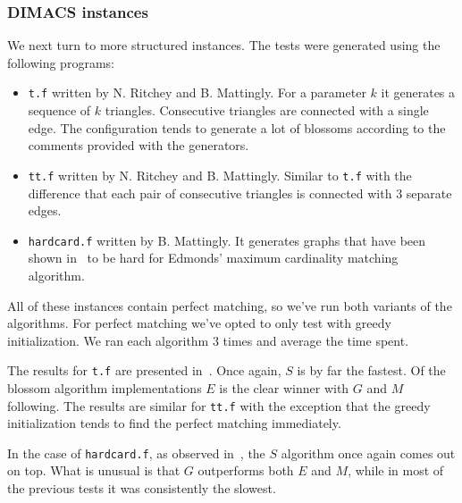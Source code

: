 \subsubsection*{DIMACS instances}

We next turn to more structured instances. The tests were generated using the following programs:

\begin{itemize}
    \item \texttt{t.f} written by N. Ritchey and B. Mattingly. For a parameter $k$ it generates a sequence of $k$ triangles. Consecutive triangles are connected with a single edge. The configuration tends to generate a lot of blossoms according to the comments provided with the generators.
    \item \texttt{tt.f} written by N. Ritchey and B. Mattingly. Similar to \texttt{t.f} with the difference that each pair of consecutive triangles is connected with $3$ separate edges.
    \item \texttt{hardcard.f} written by B. Mattingly. It generates graphs that have been shown in~\cite{gabow1976efficient} to be hard for Edmonds' maximum cardinality matching algorithm.
\end{itemize}

All of these instances contain perfect matching, so we've run both variants of the algorithms. For perfect matching we've opted to only test with greedy initialization. We ran each algorithm $3$ times and average the time spent.

The results for \texttt{t.f} are presented in~. Once again, $S$ is by far the fastest. Of the blossom algorithm implementations $E$ is the clear winner with $G$ and $M$ following. The results are similar for \texttt{tt.f} with the exception that the greedy initialization tends to find the perfect matching immediately. 

In the case of \texttt{hardcard.f}, as observed in~, the $S$ algorithm once again comes out on top. What is unusual is that $G$ outperforms both $E$ and $M$, while in most of the previous tests it was consistently the slowest.

